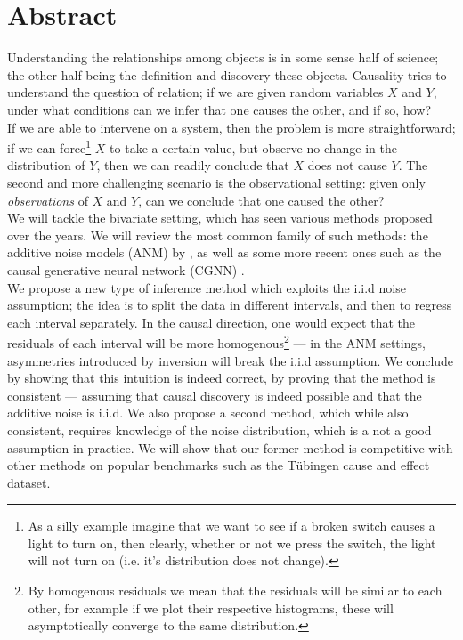 

\cleardoublepage
\chapter*{Abstract}
\vspace{0.05\textheight}

Understanding the relationships among objects is in some sense half of science; the other 
half being the definition and discovery these objects. Causality tries to understand the question of 
relation; if we are given random variables $X$ and $Y$, under what conditions can we infer that 
one causes the other, and if so, how? \\


If we are able to intervene on a system, then the problem is more straightforward; if we can force\footnote{
As a silly example imagine that we want to see if a broken switch causes a light to turn on, then clearly,
whether or not we press the switch, the light will not turn on (i.e. it's distribution does not change).}
$X$ to take a certain value, but observe no change in the distribution of $Y$, then we can readily 
conclude that $X$ does not cause $Y$.
The second and more challenging scenario is the observational setting: given 
only \textit{observations} of $X$ and $Y$, can we conclude that one caused the other? \\

We will tackle the bivariate setting, which has 
seen various methods proposed over the years. We will review the most common family of such methods: 
the additive noise models (ANM) by \cite{Mooij2016jmlr}, as well as some more recent ones such as 
the causal generative neural network (CGNN) \cite{goudet2017causal}. \\

We propose a new type of inference method which exploits the i.i.d 
noise assumption; the idea is to split the data in different intervals, and then to regress each 
interval separately. In the causal direction, one would expect that the residuals of each 
interval will be more homogenous\footnote{By homogenous residuals we mean that the residuals will 
be similar to each other, for example if we plot their respective histograms, these will asymptotically 
converge to the same distribution.} --- in the ANM settings, asymmetries introduced
by inversion will break the i.i.d assumption. We conclude by 
showing that this intuition is indeed correct, by proving that the method is consistent --- 
assuming that causal discovery is indeed possible and that the additive noise is i.i.d. We
also propose a second method, which while also consistent, requires knowledge of the 
noise distribution, which is a not a good assumption in practice. We will show that our former method is competitive with 
other methods on popular benchmarks such as the Tübingen cause and effect dataset. 




